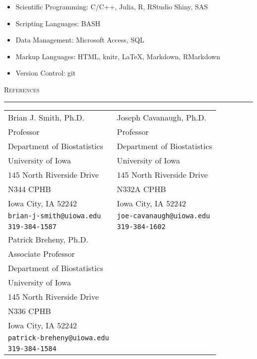 \documentclass[a4paper]{article}
\begin{document}
\begin{itemize}
  \item Scientific Programming: C/C++, Julia, R, RStudio Shiny, SAS
  \item Scripting Languages: BASH
  \item Data Management: Microsoft Access, SQL
  \item Markup Languages: HTML, knitr, \LaTeX, Markdown, RMarkdown
  \item Version Control: git
\end{itemize}


\newpage


\begin{flushleft}
  \Large\textsc{References}
  \textcolor{usafagrey}{\rule[0.5\baselineskip]{\textwidth}{0.75pt}}
\end{flushleft}
\vspace{-\baselineskip}

\begin{tabular*}{0.9\textwidth}{@{\extracolsep{\fill}}ll}
  Brian J. Smith, Ph.D.              & Joseph Cavanaugh, Ph.D.\\
  Professor                          & Professor \\
  Department of Biostatistics        & Department of Biostatistics \\
  University of Iowa                 & University of Iowa \\
  145 North Riverside Drive          & 145 North Riverside Drive \\
  N344 CPHB                          & N332A CPHB \\
  Iowa City, IA 52242                & Iowa City, IA 52242 \\
  \texttt{brian-j-smith@uiowa.edu}   & \texttt{joe-cavanaugh@uiowa.edu} \\
  \texttt{319-384-1587}              & \texttt{319-384-1602} \\[10pt]
  Patrick Breheny, Ph.D.             \\
  Associate Professor                \\
  Department of Biostatistics        \\
  University of Iowa                 \\
  145 North Riverside Drive          \\
  N336 CPHB                          \\
  Iowa City, IA 52242                \\
  \texttt{patrick-breheny@uiowa.edu} \\
  \texttt{319-384-1584}
\end{tabular*}


\end{document}
